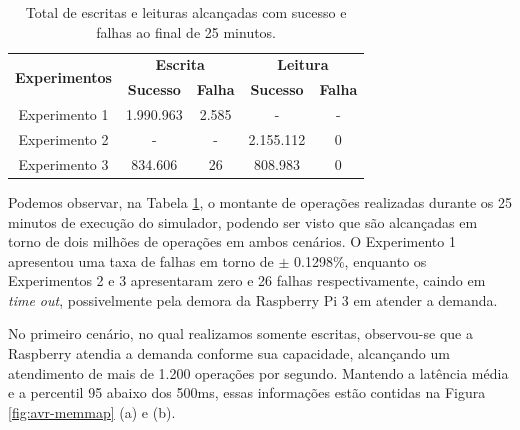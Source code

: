 \documentclass[12pt,english,brazil]{article}
\begin{document}
\begin{table}[!hb]
\centering
\caption{Total de escritas e leituras alcançadas com sucesso e falhas ao final de 25 minutos. \label{tab:usa}}
\begin{tabular}{c|c|c|cc}
\multirow{2}{*}{\textbf{Experimentos}} & \multicolumn{2}{c|}{\textbf{Escrita}} & \multicolumn{2}{c}{\textbf{Leitura}}                   \\ \cline{2-5} 
                                      & \textbf{Sucesso}   & \textbf{Falha}   & \multicolumn{1}{c|}{\textbf{Sucesso}} & \textbf{Falha} \\ \hline
Experimento 1                         & 1.990.963          & 2.585            & \multicolumn{1}{c|}{-}                & -              \\ \hline
Experimento 2                         & -                  & -                & \multicolumn{1}{c|}{2.155.112}        & 0              \\ \hline
Experimento 3                         & 834.606            & 26               & \multicolumn{1}{c|}{808.983}          & 0              \\ \hline
\end{tabular}
\end{table}

Podemos observar, na Tabela \ref{tab:usa}, o montante de operações realizadas durante os 25 minutos de execução do simulador, podendo ser visto que são alcançadas em torno de dois milhões de operações em ambos cenários. O Experimento 1 apresentou uma taxa de falhas em torno de $\pm$ 0.1298\%, enquanto os Experimentos 2 e 3 apresentaram zero e 26 falhas respectivamente, caindo em \textit{time out}, possivelmente pela demora da Raspberry Pi 3 em atender a demanda.

No primeiro cenário, no qual realizamos somente escritas, observou-se que a Raspberry atendia a demanda conforme sua capacidade, alcançando um atendimento de mais de 1.200 operações por segundo. Mantendo a latência média e a percentil 95 abaixo dos 500ms, essas informações estão contidas na Figura \ref{fig:avr-memmap} (a) e (b). 
\end{document}
